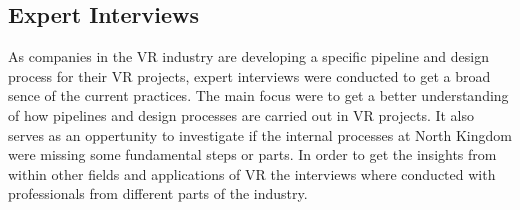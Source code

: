\subsection{Expert Interviews}
As companies in the VR industry are developing a specific pipeline and design process for their VR projects, expert interviews were conducted to get a broad sence of the current practices. The main focus were to get a better understanding of how pipelines and design processes are carried out in VR projects. It also serves as an oppertunity to investigate if the internal processes at North Kingdom were missing some fundamental steps or parts. In order to get the insights from within other fields and applications of VR the interviews where conducted with professionals from different parts of the industry.
